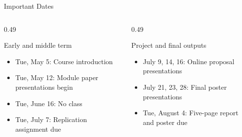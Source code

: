 \documentclass[aspectratio=169,11pt]{beamer}
\begin{document}
\begin{frame}{Important Dates}
\begin{columns}[T,onlytextwidth]
\begin{column}{0.49\textwidth}
\begin{block}{Early and middle term}
\begin{itemize}
    \item Tue, May 5: Course introduction
    \item Tue, May 12: Module paper presentations begin
    \item Tue, June 16: No class
    \item Tue, July 7: Replication assignment due
\end{itemize}
\end{block}
\end{column}
\begin{column}{0.49\textwidth}
\begin{block}{Project and final outputs}
\begin{itemize}
    \item July 9, 14, 16: Online proposal presentations
    \item July 21, 23, 28: Final poster presentations
    \item Tue, August 4: Five-page report and poster due
\end{itemize}
\end{block}
\end{column}
\end{columns}
\end{frame}
\end{document}
